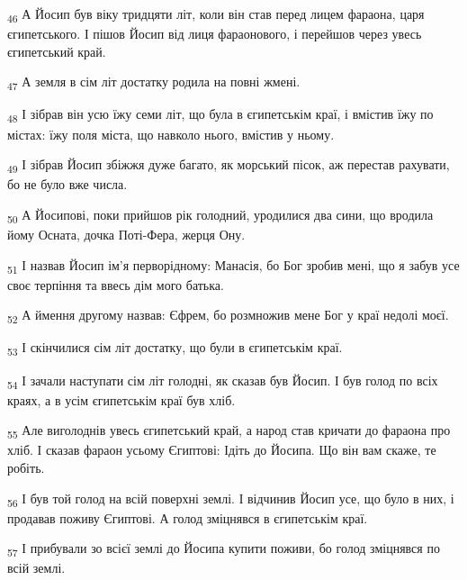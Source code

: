 \begin{tcolorbox}
\textsubscript{46} А Йосип був віку тридцяти літ, коли він став перед лицем фараона, царя єгипетського. І пішов Йосип від лиця фараонового, і перейшов через увесь єгипетський край.
\end{tcolorbox}
\begin{tcolorbox}
\textsubscript{47} А земля в сім літ достатку родила на повні жмені.
\end{tcolorbox}
\begin{tcolorbox}
\textsubscript{48} І зібрав він усю їжу семи літ, що була в єгипетськім краї, і вмістив їжу по містах: їжу поля міста, що навколо нього, вмістив у ньому.
\end{tcolorbox}
\begin{tcolorbox}
\textsubscript{49} І зібрав Йосип збіжжя дуже багато, як морський пісок, аж перестав рахувати, бо не було вже числа.
\end{tcolorbox}
\begin{tcolorbox}
\textsubscript{50} А Йосипові, поки прийшов рік голодний, уродилися два сини, що вродила йому Осната, дочка Поті-Фера, жерця Ону.
\end{tcolorbox}
\begin{tcolorbox}
\textsubscript{51} І назвав Йосип ім'я перворідному: Манасія, бо Бог зробив мені, що я забув усе своє терпіння та ввесь дім мого батька.
\end{tcolorbox}
\begin{tcolorbox}
\textsubscript{52} А ймення другому назвав: Єфрем, бо розмножив мене Бог у краї недолі моєї.
\end{tcolorbox}
\begin{tcolorbox}
\textsubscript{53} І скінчилися сім літ достатку, що були в єгипетськім краї.
\end{tcolorbox}
\begin{tcolorbox}
\textsubscript{54} І зачали наступати сім літ голодні, як сказав був Йосип. І був голод по всіх краях, а в усім єгипетськім краї був хліб.
\end{tcolorbox}
\begin{tcolorbox}
\textsubscript{55} Але виголоднів увесь єгипетський край, а народ став кричати до фараона про хліб. І сказав фараон усьому Єгиптові: Ідіть до Йосипа. Що він вам скаже, те робіть.
\end{tcolorbox}
\begin{tcolorbox}
\textsubscript{56} І був той голод на всій поверхні землі. І відчинив Йосип усе, що було в них, і продавав поживу Єгиптові. А голод зміцнявся в єгипетськім краї.
\end{tcolorbox}
\begin{tcolorbox}
\textsubscript{57} І прибували зо всієї землі до Йосипа купити поживи, бо голод зміцнявся по всій землі.
\end{tcolorbox}
